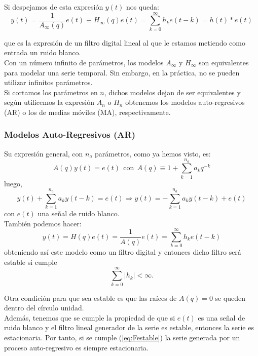 Si despejamos de esta expresión $y(t)$ nos queda:
\[	y(t) = \frac{1}{A_{\infty}(q)}e(t) \equiv H_{\infty}(q)e(t) = \sum_{k=0}^{\infty} h_k e(t-k) = h(t) \ast e(t)	\]

que es la expresión de un filtro digital lineal al que le estamos metiendo como entrada un ruido blanco.\\

Con un número infinito de parámetros, los modelos $A_{\infty}$ y $H_{\infty}$ son equivalentes para modelar una serie temporal. Sin embargo, en la práctica, no se pueden utilizar infinitos parámetros.\\
Si cortamos los parámetros en $n$, dichos modelos dejan de ser equivalentes y según utilicemos la expresión $A_n$ o $H_n$ obtenemos los modelos auto-regresivos (AR) o los de medias móviles (MA), respectivamente.

\subsubsection{Modelos Auto-Regresivos (AR)}

Su expresión general, con $n_a$ parámetros, como ya hemos visto, es:
\[	A(q)y(t) = e(t) \ \ \text{con} \ \ A(q) \equiv 1 + \sum_{k=1}^{n_a} a_k q^{-k}	\]
luego,
\[ y(t) + \sum_{k=1}^{n_a} a_k y(t-k) = e(t) \Rightarrow y(t) = - \sum_{k=1}^{n_a} a_k y(t-k) + e(t)	\]
con $e(t)$ una señal de ruido blanco.\\

También podemos hacer:
\[	y(t) = H(q) e(t) = \frac{1}{A(q)}e(t) = \sum_{k=0}^{\infty} h_k e(t-k)	\]
obteniendo así este modelo como un filtro digital y entonces dicho filtro será estable si cumple 
\begin{equation} \label{eq:Festable}
\sum_{k=0}^{\infty} |h_k| < \infty.
\end{equation}

Otra condición para que sea estable es que las raíces de $A(q) = 0$ se queden dentro del círculo unidad.\\

Además, tenemos que se cumple la propiedad de que si $e(t)$ es una señal de ruido blanco y el filtro lineal generador de la serie es estable, entonces la serie es estacionaria. Por tanto, si se cumple (\ref{eq:Festable}) la serie generada por un proceso auto-regresivo es siempre estacionaria.\\

